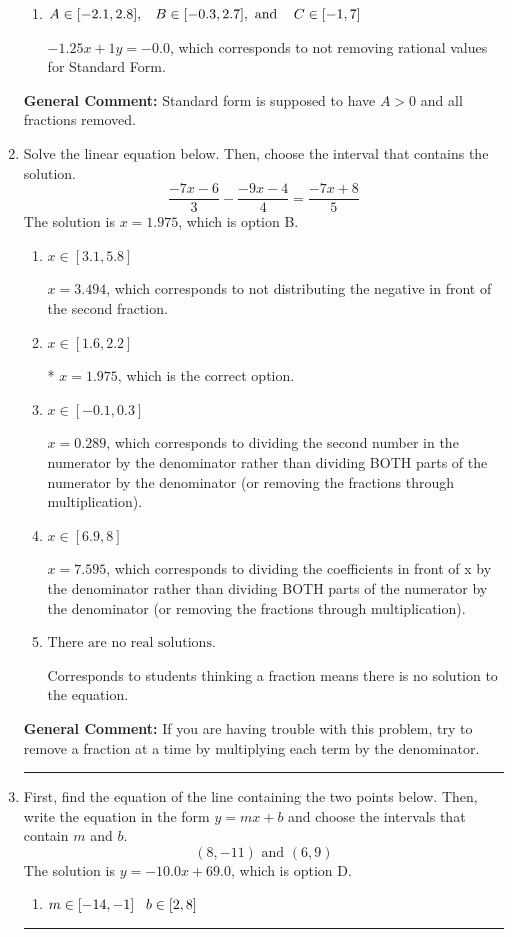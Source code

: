 \documentclass{extbook}[14pt]
\newcommand{\litem}[1]{\item #1

\rule{\textwidth}{0.4pt}}
\begin{document}
\begin{enumerate}
{\begin{enumerate}[label=\Alph*.]
 $5x + 4y = 0$, which corresponds to using the opposite (negative) slope of the graph, but did everything else correctly.
\item \( A \in [-2.1, 2.8], \hspace{3mm} B \in [-0.3, 2.7], \text{ and } \hspace{3mm} C \in [-1, 7] \)

 $-1.25x + 1y = -0.0$, which corresponds to not removing rational values for Standard Form.
\end{enumerate}

\textbf{General Comment:} Standard form is supposed to have $A > 0$ and all fractions removed.
}
\litem{
Solve the linear equation below. Then, choose the interval that contains the solution.
\[ \frac{-7x -6}{3} - \frac{-9x -4}{4} = \frac{-7x + 8}{5} \]The solution is \( x = 1.975 \), which is option B.\begin{enumerate}[label=\Alph*.]
\item \( x \in [3.1, 5.8] \)

 $x = 3.494$, which corresponds to not distributing the negative in front of the second fraction.
\item \( x \in [1.6, 2.2] \)

* $x = 1.975$, which is the correct option.
\item \( x \in [-0.1, 0.3] \)

 $x = 0.289$, which corresponds to dividing the second number in the numerator by the denominator rather than dividing BOTH parts of the numerator by the denominator (or removing the fractions through multiplication).
\item \( x \in [6.9, 8] \)

 $x = 7.595$, which corresponds to dividing the coefficients in front of x by the denominator rather than dividing BOTH parts of the numerator by the denominator (or removing the fractions through multiplication).
\item \( \text{There are no real solutions.} \)

Corresponds to students thinking a fraction means there is no solution to the equation.
\end{enumerate}

\textbf{General Comment:} If you are having trouble with this problem, try to remove a fraction at a time by multiplying each term by the denominator.
}
\litem{
First, find the equation of the line containing the two points below. Then, write the equation in the form $ y=mx+b $ and choose the intervals that contain $m$ and $b$.
\[ (8, -11) \text{ and } (6, 9) \]The solution is \( y = -10.0x + 69.0 \), which is option D.\begin{enumerate}[label=\Alph*.]
\item \( m \in [-14, -1] \hspace*{3mm} b \in [2, 8] \)


\end{enumerate}}
\end{enumerate}
\end{document}
